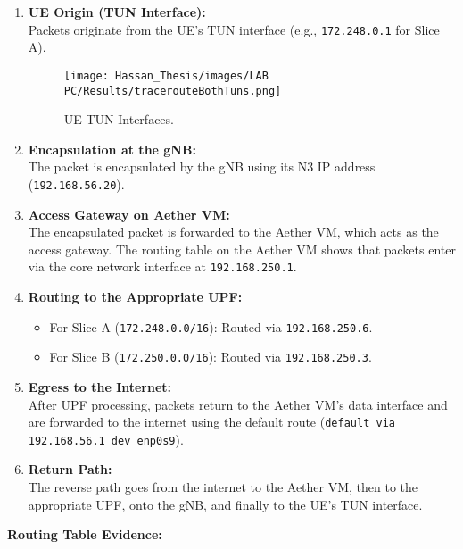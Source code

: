 \begin{enumerate}
    \item \textbf{UE Origin (TUN Interface):}\\
    Packets originate from the UE’s TUN interface (e.g., \texttt{172.248.0.1} for Slice A).

    \begin{figure}[htbp]
        \centering
        \texttt{[image: Hassan\_Thesis/images/LAB PC/Results/tracerouteBothTuns.png]}
        \caption{UE TUN Interfaces.}
        \label{fig:ue-tun-interface}
    \end{figure}

    \item \textbf{Encapsulation at the gNB:}\\
    The packet is encapsulated by the gNB using its N3 IP address (\texttt{192.168.56.20}).

    \item \textbf{Access Gateway on Aether VM:}\\
    The encapsulated packet is forwarded to the Aether VM, which acts as 
    the access gateway. The routing table on the Aether VM shows that 
    packets enter via the core network interface at \texttt{192.168.250.1}.

    \item \textbf{Routing to the Appropriate UPF:}\\
    \begin{itemize}
        \item For Slice A (\texttt{172.248.0.0/16}): Routed via \texttt{192.168.250.6}.
        \item For Slice B (\texttt{172.250.0.0/16}): Routed via \texttt{192.168.250.3}.
    \end{itemize}

    \item \textbf{Egress to the Internet:}\\
    After UPF processing, packets return to the Aether VM’s data interface 
    and are forwarded to the internet using the default route 
    (\texttt{default via 192.168.56.1 dev enp0s9}).

    \item \textbf{Return Path:}\\
    The reverse path goes from the internet to the Aether VM, then to the 
    appropriate UPF, onto the gNB, and finally to the UE’s TUN interface.
\end{enumerate}

\noindent
\textbf{Routing Table Evidence:}\\

